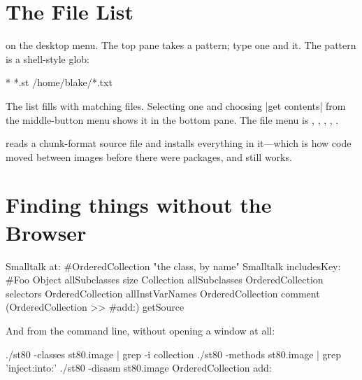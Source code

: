 \section{The File List}

 on the desktop menu. The top pane takes a pattern; type one and
 it. The pattern is a shell-style glob:

\begin{st}
*
*.st
/home/blake/*.txt
\end{st}

The list fills with matching files. Selecting one and choosing \ct|get contents| from the middle-button menu shows it in the bottom pane. The file menu is
, , , , .

 reads a chunk-format source file and installs everything in
it---which is how code moved between images before there were packages, and
still works.

\section{Finding things without the Browser}

\begin{st}
Smalltalk at: #OrderedCollection      "the class, by name"
Smalltalk includesKey: #Foo
Object allSubclasses size
Collection allSubclasses
OrderedCollection selectors
OrderedCollection allInstVarNames
OrderedCollection comment
(OrderedCollection >> #add:) getSource
\end{st}

And from the command line, without opening a window at all:

\begin{sh}
./st80 -classes st80.image | grep -i collection
./st80 -methods st80.image | grep 'inject:into:'
./st80 -disasm st80.image OrderedCollection add:
\end{sh}
